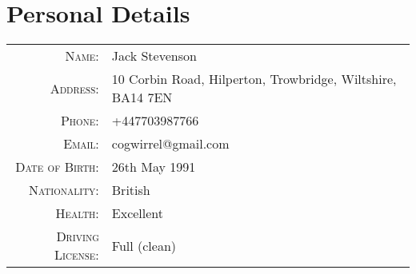 \par{\bigskip\par}

\section{Personal Details}

\begin{tabular}{rl}
\textsc{Name:} & Jack Stevenson\\
\textsc{Address:} & 10 Corbin Road, Hilperton, Trowbridge, Wiltshire, BA14 7EN \\
\textsc{Phone:} & +447703987766\\
\textsc{Email:} & cogwirrel@gmail.com \\
\textsc{Date of Birth:} & 26th May 1991 \\
\textsc{Nationality:} & British \\
\textsc{Health:} & Excellent \\
\textsc{Driving License:} & Full (clean)
\end{tabular}